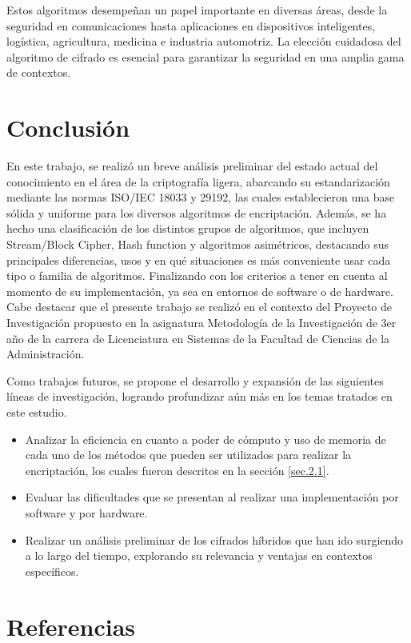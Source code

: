 \documentclass[a4paper,10pt]{article}
\begin{document}
	Estos algoritmos desempeñan un papel importante en diversas áreas, desde la seguridad en comunicaciones hasta aplicaciones en dispositivos inteligentes, logística, agricultura, medicina e industria automotriz. La elección cuidadosa del algoritmo de cifrado es esencial para garantizar la seguridad en una amplia gama de contextos.
	
	\section{Conclusión}
	\label{seccion4}
	En este trabajo, se realizó un breve análisis preliminar del estado actual del conocimiento en el área de la criptografía ligera, abarcando su estandarización mediante las normas ISO/IEC 18033 y 29192, las cuales establecieron una base sólida y uniforme para los diversos algoritmos de encriptación. Además, se ha hecho una clasificación de los distintos grupos de algoritmos, que incluyen Stream/Block Cipher, Hash function y algoritmos asimétricos, destacando sus principales diferencias, usos y en qué situaciones es más conveniente usar cada tipo o familia de algoritmos. Finalizando con los criterios a tener en cuenta al momento de su implementación, ya sea en entornos de software o de hardware. Cabe destacar que el presente trabajo se realizó en el contexto del Proyecto de Investigación propuesto en la asignatura Metodología de la Investigación de 3er año de la carrera de Licenciatura en Sistemas de la Facultad de Ciencias de la Administración.
	
	Como trabajos futuros, se propone el desarrollo y expansión de las siguientes líneas de investigación, logrando profundizar aún más en los temas tratados en este estudio.

	\begin{itemize}
	\item Analizar la eficiencia en cuanto a poder de cómputo y uso de memoria de cada uno de los métodos que pueden ser utilizados para realizar la encriptación, los cuales fueron descritos en la sección \ref{sec.2.1}.
	\item Evaluar las dificultades que se presentan al realizar una implementación por software y por hardware.
	\item Realizar un análisis preliminar de los cifrados híbridos que han ido surgiendo a lo largo del tiempo, explorando su relevancia y ventajas en contextos específicos.
	\end{itemize}
	
	\section{Referencias}
	\nocite{*}
	\printbibliography[heading=none]
\end{document}
